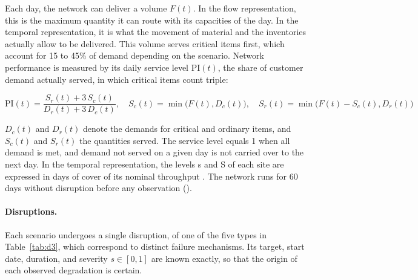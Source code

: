 Each day, the network can deliver a volume $F(t)$. In the flow representation, this is the maximum quantity it can route with its capacities of the day. In the temporal representation, it is what the movement of material and the inventories actually allow to be delivered. This volume serves critical items first, which account for 15 to 45\% of demand depending on the scenario. Network performance is measured by its daily service level $\mathrm{PI}(t)$, the share of customer demand actually served, in which critical items count triple:

\begin{equation}
\mathrm{PI}(t) = \frac{S_r(t) + 3\,S_c(t)}{D_r(t) + 3\,D_c(t)}, \quad S_c(t) = \min\big(F(t), D_c(t)\big), \quad S_r(t) = \min\big(F(t) - S_c(t), D_r(t)\big)
\label{eq:1}
\end{equation}

$D_{c}(t)$ and $D_{r}(t)$ denote the demands for critical and ordinary items, and $S_{c}(t)$ and $S_{r}(t)$ the quantities served. The service level equals 1 when all demand is met, and demand not served on a given day is not carried over to the next day. In the temporal representation, the levels s and S of each site are expressed in days of cover of its nominal throughput \citep{scarf1960, little1961}. The network runs for 60 days without disruption before any observation ().

\paragraph{Disruptions.} Each scenario undergoes a single disruption, of one of the five types in Table~\ref{tab:d3}, which correspond to distinct failure mechanisms. Its target, start date, duration, and severity $s \in [0,1]$ are known exactly, so that the origin of each observed degradation is certain.\\

